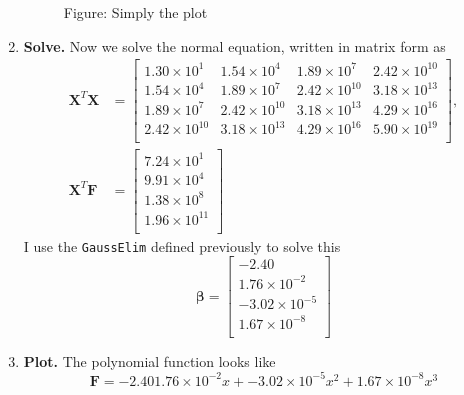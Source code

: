 \documentclass[../../../main.tex]{subfiles}
\begin{document}
\begin{enumerate}
          \begin{figure}[b]
              \centering
              \caption*{Figure: Simply the plot}
          \end{figure}


    \item \textbf{Solve.} Now we solve the normal equation, written in matrix form as
          \begin{align*}
              \mathbf{X}^T \mathbf{X} & =
              \begin{bmatrix}
                  1.30\times 10^{1}  & 1.54\times 10^{4}  & 1.89\times 10^{7}  & 2.42\times 10^{10} \\
                  1.54\times 10^{4}  & 1.89\times 10^{7}  & 2.42\times 10^{10} & 3.18\times 10^{13} \\
                  1.89\times 10^{7}  & 2.42\times 10^{10} & 3.18\times 10^{13} & 4.29\times 10^{16} \\
                  2.42\times 10^{10} & 3.18\times 10^{13} & 4.29\times 10^{16} & 5.90\times 10^{19} \\
              \end{bmatrix},
              \\
              \mathbf{X}^T\mathbf{F}  & =
              \begin{bmatrix}
                  7.24\times 10^{1}  \\
                  9.91\times 10^{4}  \\
                  1.38\times 10^{8}  \\
                  1.96\times 10^{11} \\
              \end{bmatrix}
          \end{align*}
          I use the \verb|GaussElim| defined previously to solve this
          \begin{equation*}
              \boldsymbol{\beta}=
              \begin{bmatrix}
                  -2.40               \\
                  1.76\times 10^{-2}  \\
                  -3.02\times 10^{-5} \\
                  1.67\times 10^{-8}  \\
              \end{bmatrix}
          \end{equation*}


    \item \textbf{Plot.} The polynomial function looks like
          \begin{equation*}
              \mathbf{F}=
              -2.40
              1.76\times 10^{-2}  x+
              -3.02\times 10^{-5} x^2+
              1.67\times 10^{-8}  x^3
          \end{equation*}

\end{enumerate}
\end{document}
